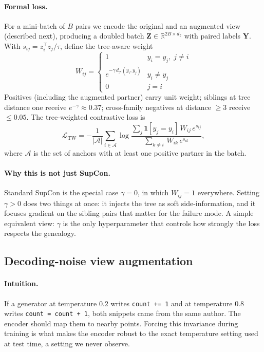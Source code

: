 ﻿\documentclass[11pt]{article}
\begin{document}
\paragraph{Formal loss.} For a mini-batch of $B$ pairs we encode the
original and an augmented view (described next), producing a
doubled batch $\mathbf{Z} \in \mathbb{R}^{2B \times d_z}$ with paired
labels $\mathbf{Y}$. With $s_{ij} = z_i^{\!\top}\!z_j / \tau$, define
the tree-aware weight
\begin{equation}
W_{ij} \!=\!\begin{cases}
  1 & y_i \!=\! y_j,\;j\!\neq\!i \\
  e^{-\gamma\,d_{\mathcal{T}}(y_i, y_j)} & y_i \!\neq\! y_j \\
  0 & j\!=\!i
\end{cases}
\end{equation}
Positives (including the augmented partner) carry unit weight;
siblings at tree distance one receive
$e^{-\gamma}\!\approx\!0.37$; cross-family negatives at distance
$\ge\!3$ receive $\le\!0.05$. The tree-weighted contrastive loss is
\begin{equation}
\mathcal{L}_{\mathrm{TW}}
= -\!\frac{1}{|\mathcal{A}|}\!\sum_{i \in \mathcal{A}}\!
  \log \frac{\textstyle\sum_{j} \mathbf{1}[y_j\!=\!y_i]\,W_{ij}\,e^{s_{ij}}}
            {\textstyle\sum_{k \neq i}\,W_{ik}\,e^{s_{ik}}},
\end{equation}
where $\mathcal{A}$ is the set of anchors with at least one positive
partner in the batch.

\paragraph{Why this is not just SupCon.} Standard SupCon is the
special case $\gamma\!=\!0$, in which $W_{ij} = 1$ everywhere. Setting
$\gamma\!>\!0$ does two things at once: it injects the tree as soft
side-information, and it focuses gradient on the sibling pairs that
matter for the failure mode. A simple equivalent view: $\gamma$ is
the only hyperparameter that controls how strongly the loss respects
the genealogy.

\subsection{Decoding-noise view augmentation}
\label{sec:method-aug}

\paragraph{Intuition.} If a generator at temperature $0.2$ writes
\texttt{count += 1} and at temperature $0.8$ writes
\texttt{count = count + 1}, both snippets came from the same author.
The encoder should map them to nearby points. Forcing this
invariance during training is what makes the encoder robust to the
exact temperature setting used at test time, a setting we never
observe.
\end{document}
